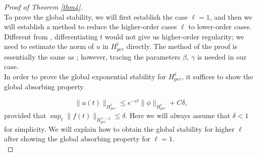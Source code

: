 \documentclass[10pt,a4paper,final]{article}
\numberwithin{equation}{section}
\newcommand{\cH}{\mathcal{H}}
\newcommand{\Gb}{\beta}
\newcommand{\Gg}{\gamma}
\begin{document}

\begin{proof}[Proof of Theorem \ref{thm4}]\ \\
To prove the global stability, we will first establish the case $\ell=1$, and then we will establish a method to reduce the higher-order cases $\ell$ to lower-order cases. Different from \cite{WZ}, differentiating $t$ would not give us higher-order regularity; we need to estimate the norm of $u$ in $H^{\ell}_{per}$ directly. The method of the proof is essentially the same as \cite{LW}; however, tracing the parameters $\Gb,\ \Gg$ is needed in our case. \\

In order to prove the global exponential stability for $H^{\ell}_{per}$, it suffices to show the global absorbing property

$$\|u(t)\|_{H^{\ell}_{per}}\leq e^{-ct}\|\phi\|_{H^{\ell}_{per}}+C\delta,$$
provided that $\sup_{t}\|f(t)\|_{H^{\ell-2}_{per}}\leq \delta$. Here we will always assume that $\delta <1$ for simplicity. We will explain how to obtain the global stability for higher $\ell$ after showing the global absorbing property for $\ell=1$.\\




\end{proof}
\end{document}
